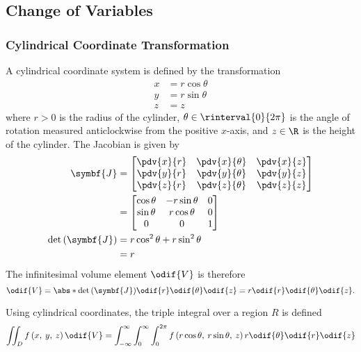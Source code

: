 \documentclass{article}
\begin{document}
\subsection{Change of Variables}
\subsubsection{Cylindrical Coordinate Transformation}
\begin{definition}
    A cylindrical coordinate system is defined by the \linebreak transformation
    \begin{align*}
        x & = r \cos{\theta} \\
        y & = r \sin{\theta} \\
        z & = z
    \end{align*}
    where \(r > 0\) is the radius of the cylinder,
    \(\theta \in \rinterval{0}{2\pi}\) is the angle of rotation
    measured anticlockwise from the positive \(x\)-axis, and \(z \in \R\)
    is the height of the cylinder.
    The Jacobian is given by
    \begin{align*}
        \symbf{J}                      & =
        \begin{bmatrix}
            \displaystyle\pdv{x}{r} & \displaystyle\pdv{x}{\theta} & \displaystyle\pdv{x}{z} \\
            \displaystyle\pdv{y}{r} & \displaystyle\pdv{y}{\theta} & \displaystyle\pdv{y}{z} \\
            \displaystyle\pdv{z}{r} & \displaystyle\pdv{z}{\theta} & \displaystyle\pdv{z}{z} \\
        \end{bmatrix}
        \\
                                       & =
        \begin{bmatrix}
            \cos{\theta} & -r \sin{\theta} & 0 \\
            \sin{\theta} & r \cos{\theta}  & 0 \\
            0            & 0               & 1 \\
        \end{bmatrix}
        \\
        \det{\left( \symbf{J} \right)} & = r \cos^2{\theta} + r \sin^2{\theta} \\
                                       & = r
    \end{align*}
    The infinitesimal volume element \(\odif{V}\) is therefore
    \begin{equation*}
        \odif{V} = \abs*{\det{\left( \symbf{J} \right)}} \odif{r}\odif{\theta}\odif{z} = r \odif{r}\odif{\theta}\odif{z}.
    \end{equation*}
\end{definition}
Using cylindrical coordinates, the triple integral over a region \(R\) is
defined
\begin{equation*}
    \iint_D f\left( x,\: y,\: z \right) \odif{V} = \int_{-\infty}^{\infty} \int_0^\infty \int_0^{2\pi} f\left( r \cos{\theta},\: r \sin{\theta},\: z \right) r \odif{\theta} \odif{r} \odif{z}
\end{equation*}
\end{document}
